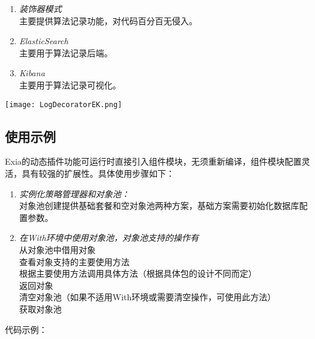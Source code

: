 \documentclass[cn,hazy,blue,14pt,screen]{elegantnote}
\begin{document}
\begin{enumerate}[label=\arabic*).]
	\item \textit{装饰器模式}\\
	主要提供算法记录功能，对代码百分百无侵入。
	\item \textit{ElasticSearch}\\
	主要用于算法记录后端。	
	\item \textit{Kibana}\\
	主要用于算法记录可视化。\\
\end{enumerate}

\centerline{
	\texttt{[image: LogDecoratorEK.png]}
}



\subsection{使用示例}

Exia的动态插件功能可运行时直接引入组件模块，无须重新编译，组件模块配置灵活，具有较强的扩展性。具体使用步骤如下：

\begin{enumerate}[label=\arabic*).]
	\item \textit{实例化策略管理器和对象池：}\\
	对象池创建提供基础套餐和空对象池两种方案，基础方案需要初始化数据库配置参数。
	\item \textit{在With环境中使用对象池，对象池支持的操作有}\\
	从对象池中借用对象\\
	查看对象支持的主要使用方法\\
	根据主要使用方法调用具体方法（根据具体包的设计不同而定）\\
	返回对象\\
	清空对象池（如果不适用With环境或需要清空操作，可使用此方法）\\
	获取对象池
\end{enumerate}

代码示例：
\end{document}
